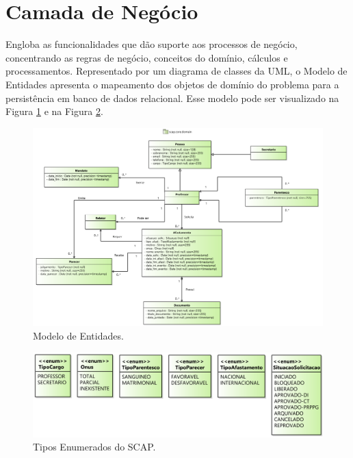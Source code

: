 \section{Camada de Negócio}
\label{sec-arquitetura-negocio}


Engloba as funcionalidades que dão suporte aos processos de negócio, concentrando as regras de negócio, conceitos do domínio, cálculos e processamentos. Representado por um diagrama de classes da UML, o Modelo de Entidades apresenta o mapeamento dos objetos de domínio do problema para a persistência em banco de dados relacional. Esse modelo pode ser visualizado na Figura \ref{figura-arquitetura-entidade} e na Figura \ref{figura-arquitetura-enum}.  

\begin{figure}[h]
	\centering
	\includegraphics[width=1\textwidth]{figuras/figura-arquitetura-entidade.png}
	\caption{Modelo de Entidades.}
	\label{figura-arquitetura-entidade}
\end{figure}

\begin{figure}[h]
	\centering
	\includegraphics[width=1\textwidth]{figuras/figura-arquitetura-enum.png}
	\caption{Tipos Enumerados do SCAP.}
	\label{figura-arquitetura-enum}
\end{figure}

